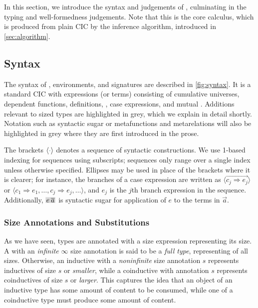 \section{\titlelang}\label{sec:typing}
In this section, we introduce the syntax and judgements of \lang,
culminating in the typing and well-formedness judgements.
Note that this is the core calculus, which is produced from plain CIC by the inference algorithm,
introduced in \autoref{sec:algorithm}.

\subsection{Syntax}

\label{sec:typing:syntax}

The syntax of \lang, environments, and signatures are described in \autoref{fig:syntax}.
It is a standard CIC with expressions (or terms) consisting of cumulative universes, dependent functions, definitions, \coinductives, case expressions, and mutual \cofixpoints.
Additions relevant to sized types are highlighted in grey,
which we explain in detail shortly.
Notation such as syntactic sugar or metafunctions and metarelations will also be highlighted in grey
where they are first introduced in the prose.

The brackets $\seq{\ph}$ denotes a sequence of syntactic constructions.
We use 1-based indexing for sequences using subscripts;
sequences only range over a single index unless otherwise specified.
Ellipses may be used in place of the brackets where it is clearer;
for instance, the branches of a case expression are written as
$\langle \vec{c_j \Rightarrow e_j} \rangle$ or
$\langle c_1 \Rightarrow e_1, \dots, c_j \Rightarrow e_j, \dots \rangle$,
and $e_j$ is the $j$th branch expression in the sequence.
Additionally, $\new{\app{e}{\vec{a}}}$ is syntactic sugar for application of $e$ to the terms in $\vec{a}$.

\subsubsection{Size Annotations and Substitutions}

As we have seen, \coinductive types are annotated with a size expression representing its size.
A \coinductive with an \textit{infinite} $\infty$ size annotation is said to be a \textit{full type},
representing \coinductives of all sizes.
Otherwise, an inductive with a \textit{noninfinite} size annotation $s$ represents inductives of size $s$ or \emph{smaller},
while a coinductive with annotation $s$ represents coinductives of size $s$ or \emph{larger}.
This captures the idea that an object of an inductive type has some amount of content to be consumed,
while one of a coinductive type must produce some amount of content.

